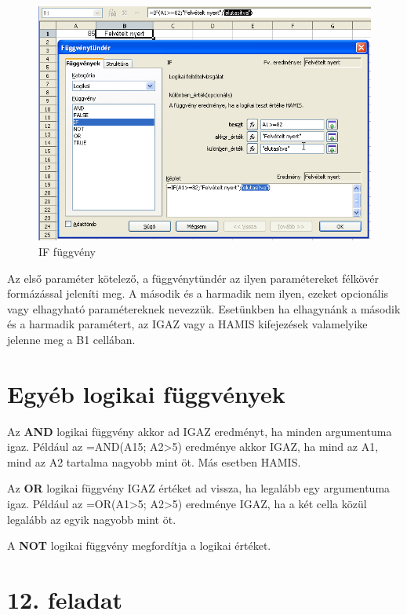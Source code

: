 \begin{figure}[!h]
\begin{center}
\includegraphics[width=13.199cm]{oocalcv1-img66.png}
\caption{IF függvény}\label{ifFüggvény}
\end{center}
\end{figure}

Az első paraméter kötelező, a függvénytündér az
ilyen paramétereket félkövér formázással jeleníti meg. A
második és a harmadik nem ilyen, ezeket opcionális vagy
elhagyható paramétereknek nevezzük. Esetünkben ha elhagynánk
a második és a harmadik paramétert, az IGAZ vagy a HAMIS
kifejezések valamelyike jelenne meg a B1 cellában.


\section{Egyéb logikai függvények}

Az \textbf{AND} logikai függvény akkor ad IGAZ eredményt, ha
minden argumentuma igaz. Például az =AND(A15;
A2>5) eredménye akkor IGAZ, ha mind az A1, mind az A2
tartalma nagyobb mint öt. Más esetben HAMIS.

Az \textbf{OR} logikai függvény IGAZ értéket ad vissza, ha
legalább egy argumentuma igaz. Például az =OR(A1>5;
A2>5) eredménye IGAZ, ha a két cella közül
legalább az egyik nagyobb mint öt. 

A \textbf{NOT} logikai függvény megfordítja a logikai értéket.


\section{12. feladat}


